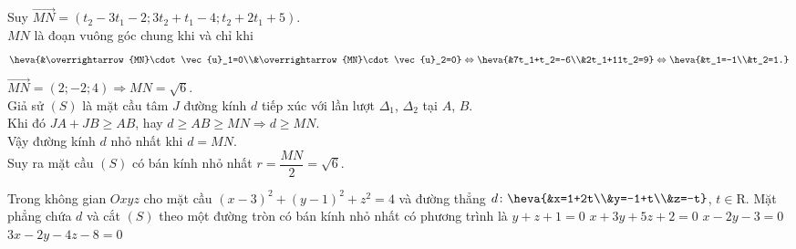 \begin{ex}
{		Suy $\overrightarrow{MN}=\left(t_2-3t_1-2;3t_2+t_1-4;t_2+2t_1+5\right)$.\\
		$MN$ là đoạn vuông góc chung khi và chỉ khi \\
		$$\heva{&\overrightarrow{MN}\cdot \vec{u}_1=0\\&\overrightarrow{MN}\cdot \vec{u}_2=0} \Leftrightarrow\heva{&7t_1+t_2=-6\\&2t_1+11t_2=9} \Leftrightarrow\heva{&t_1=-1\\&t_2=1.}$$
		$\overrightarrow{MN}=(2;-2;4) \Rightarrow MN=\sqrt{6}$.\\
		Giả sử $(S)$ là mặt cầu tâm $J$ đường kính $d$ tiếp xúc với lần lượt $\Delta_1$, $\Delta_2$ tại $A$, $B$.\\ Khi đó $JA+JB\ge AB$, hay $d\ge AB \ge MN \Rightarrow d\ge MN$.\\ Vậy đường kính $d$ nhỏ nhất khi $d=MN$.\\
		Suy ra mặt cầu $(S)$ có bán kính nhỏ nhất $r=\dfrac{MN}{2}=\sqrt{6}$.
	} 
\end{ex} 
\begin{ex}%
	Trong không gian $Oxyz$ cho mặt cầu $(x-3)^{2}+(y-1)^{2}+z^{2}=4$ và đường thẳng $d\colon\heva{&x=1+2t\\&y=-1+t\\&z=-t}$, $t\in \mathrm{R}$. Mặt phẳng chứa  $d$  và cắt $(S)$ theo một đường tròn có bán kính nhỏ nhất có phương trình là
	\choice
	{\True $y+z+1=0$}
	{$x+3y+5z+2=0$}
	{$x-2y-3=0$}
	{$3x-2y-4z-8=0$}
\end{ex} 
